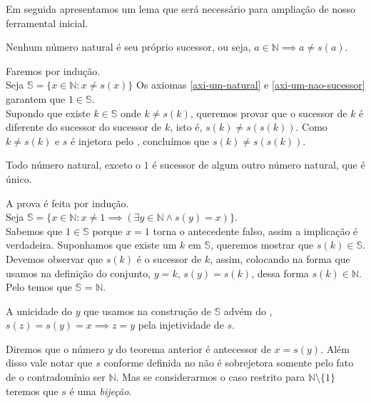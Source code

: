 \documentclass[../main.tex]{subfiles}
\begin{document}
Em seguida apresentamos um lema que será necessário para ampliação de nosso ferramental inicial.
\begin{lema}\label{n-dif-sucessor}
    Nenhum número natural é seu próprio sucessor, ou seja, $a \in \mathbb{N} \implies a \neq s(a) $.
\end{lema}
\begin{dem}
    Faremos por indução.\\
    Seja $\mathbb{S} = \{x \in \mathbb{N} : x \neq s(x) \}$
    Os axiomas \ref{axi-um-natural} e \ref{axi-um-nao-sucessor} garantem que $1 \in \mathbb{S}$.\\
    Supondo que existe $ k \in \mathbb{S}$ onde $ k \neq s(k)$, queremos provar que o sucessor de $k$ é diferente do sucessor do sucessor de $k$, isto é, $s(k) \neq s(s(k))$. Como $k \neq s(k)$ e $s$ é injetora pelo , concluímos que $s(k) \neq s(s(k))$.
\end{dem}
\begin{teo}\label{nat-suc-unico}
    Todo número natural, exceto o $1$ é sucessor de algum outro número natural, que é único.
\end{teo}
\begin{dem}
    A prova é feita por indução. \\ 
    Seja $\mathbb{S} = \{x \in \mathbb{N} : x \neq 1 \implies (\exists y \in \mathbb{N} \land s(y) = x) \}$.\\
    Sabemos que $1 \in \mathbb{S}$ porque $x = 1$ torna o antecedente falso, assim a implicação é verdadeira. Suponhamos que existe um $k$ em $\mathbb{S}$, queremos mostrar que $s(k) \in \mathbb{S}$. Devemos observar que $s(k)$ é o sucessor de $k$, assim, colocando na forma que usamos na definição do conjunto,
    $y = k$, $s(y) = s(k)$, dessa forma $s(k) \in \mathbb{N}$. Pelo  temos que $\mathbb{S}$ = $\mathbb{N}$.

    A unicidade do $y$ que usamos na construção de $\mathbb{S}$ advém do , $s(z) = s(y) = x \implies z = y$ pela injetividade de $s$.
\end{dem}
\begin{obs}
    Diremos que o número $y$ do teorema anterior é antecessor de $x = s(y)$. Além disso vale notar que $s$ conforme definida no  não é sobrejetora somente pelo fato de o contradomínio ser $\mathbb{N}$. Mas se considerarmos o caso restrito para $\mathbb{N} \setminus \{1\}$ 
    teremos que $s$ é uma \emph{bijeção}.
\end{obs}
\end{document}
